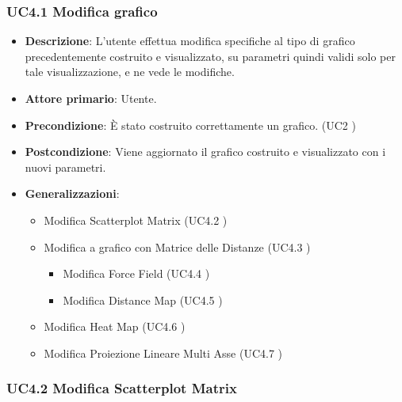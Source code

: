 \newpage
\subsubsection{UC4.1 Modifica grafico}
\label{ssub:uc4.1}

\begin{itemize}
    \item \textbf{Descrizione}: L’utente effettua modifica specifiche al tipo di grafico precedentemente costruito e visualizzato, 
                                su parametri quindi validi solo per tale visualizzazione, e ne vede le modifiche.
	
    \item \textbf{Attore primario}: Utente.
    
    \item \textbf{Precondizione}:   È stato costruito correttamente un grafico. (UC2 )

    \item \textbf{Postcondizione}:  Viene aggiornato il grafico costruito e visualizzato con i nuovi parametri.

    \item \textbf{Generalizzazioni}:
        \begin{itemize}
            \item Modifica Scatterplot Matrix (UC4.2 )
            \item Modifica a grafico con Matrice delle Distanze (UC4.3 )
            \begin{itemize}
                \item Modifica Force Field (UC4.4 )
                \item Modifica Distance Map (UC4.5 )
             \end{itemize}
            \item Modifica Heat Map (UC4.6 )
            \item Modifica Proiezione Lineare Multi Asse (UC4.7 )
        \end{itemize}
\end{itemize}

\subsubsection{UC4.2 Modifica Scatterplot Matrix}
\label{ssub:uc4.2}

